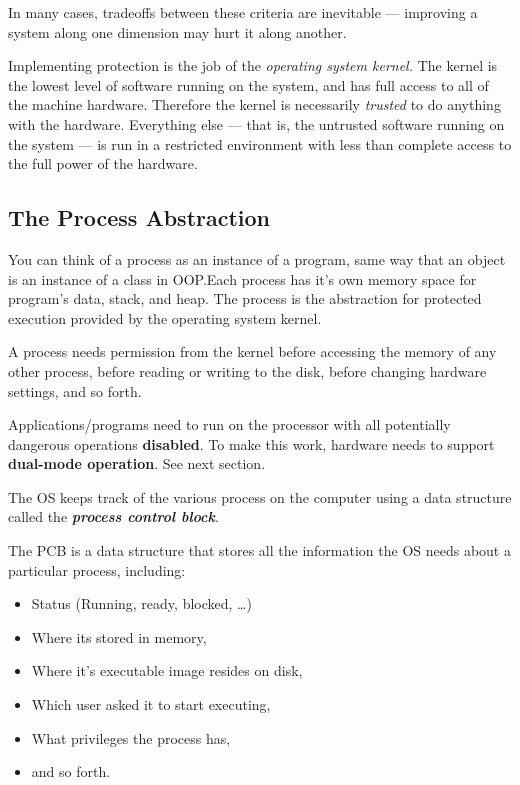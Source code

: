 \documentclass{article}
\begin{document}
In many cases, tradeoffs between these criteria are inevitable --- improving a system along one dimension may hurt it along another.

\newpage



\begin{definition}[Kernel]
    Implementing protection is the job of the \textit{operating system kernel.} The kernel is the lowest level of software running on the system, and has full access to all of the machine hardware. Therefore the kernel is necessarily \textit{trusted} to do anything with the hardware. Everything else --- that is, the untrusted software running on the system --- is run in a restricted environment with less than complete access to the full power of the hardware.
\end{definition}
\subsection{The Process Abstraction}
\begin{definition}[Process]
    You can think of a process as an instance of a program, same way that an object is an instance of a class in OOP.\@ Each process has it's own memory space for program's data, stack, and heap. The process is the abstraction for protected execution provided by the operating system kernel.
\end{definition}
A process needs permission from the kernel before accessing the memory of any other process, before reading or writing to the disk, before changing hardware settings, and so forth.

Applications/programs need to run on the processor with all potentially dangerous operations \textbf{disabled}. To make this work, hardware needs to support \textbf{dual-mode operation}. See next section.

The OS keeps track of the various process on the computer using a data structure called the \textit{\textbf{process control block}}.

\begin{definition}
    The PCB is a data structure that stores all the information the OS needs about a particular process, including:
    \begin{itemize}
        \item Status (Running, ready, blocked, \ldots)
        \item Where its stored in memory,
        \item Where it's executable image resides on disk,
        \item Which user asked it to start executing,
        \item What privileges the process has,
        \item and so forth.
    \end{itemize}

\end{definition}
\end{document}
